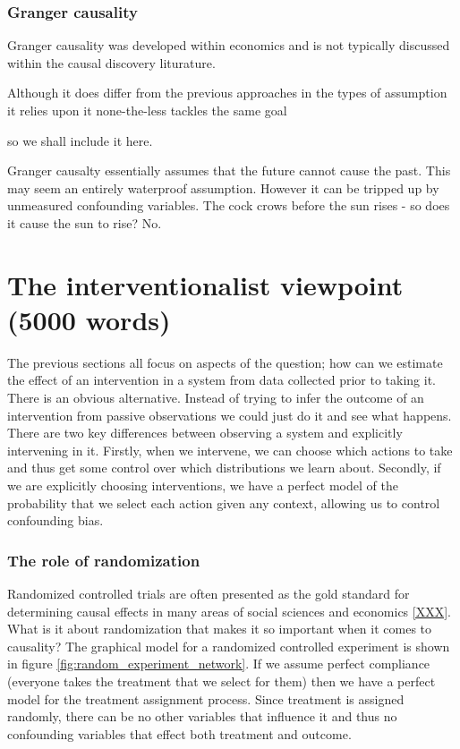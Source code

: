 \documentclass[11pt,a4paper,oneside]{book}
\begin{document}
\subsection*{Granger causality}

Granger causality was developed within economics and is not typically discussed within the causal discovery liturature.  

Although it does differ from the previous approaches in the types of assumption it relies upon it none-the-less tackles the same goal 

so we shall include it here. 

Granger causalty essentially assumes that the future cannot cause the past. This may seem an entirely waterproof assumption. However it can be tripped up by unmeasured confounding variables. The cock crows before the sun rises - so does it cause the sun to rise? No. 



\chapter*{The interventionalist viewpoint (5000 words)}

The previous sections all focus on aspects of the question; how can we estimate the effect of an intervention in a system from data collected prior to taking it. There is an obvious alternative. Instead of trying to infer the outcome of an intervention from passive observations we could just do it and see what happens. There are two key differences between observing a system and explicitly intervening in it. Firstly, when we intervene, we can choose which actions to take and thus get some control over which distributions we learn about. Secondly, if we are explicitly choosing interventions, we have a perfect model of the probability that we select each action given any context, allowing us to control confounding bias. 

\subsection*{The role of randomization}
Randomized controlled trials are often presented as the gold standard for determining causal effects in many areas of social sciences and economics \ref{XXX}. What is it about randomization that makes it so important when it comes to causality? The graphical model for a randomized controlled experiment is shown in figure \ref{fig:random_experiment_network}. If we assume perfect compliance (everyone takes the treatment that we select for them) then we have a perfect model for the treatment assignment process. Since treatment is assigned randomly, there can be no other variables that influence it and thus no confounding variables that effect both treatment and outcome. 
\end{document}
